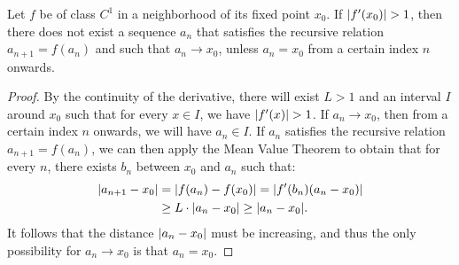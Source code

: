 \begin{theorem}
Let $f$ be of class $C^1$ in a neighborhood of its fixed point $x_0$. If
${\left|f'(x_0)\right|}>1$, then there does not exist a sequence $a_n$ that satisfies the
recursive relation $a_{n+1} = f(a_n)$ and such that $a_n \to x_0$, unless $a_n =
x_0$ from a certain index $n$ onwards.
\end{theorem}
%
\begin{proof}
By the continuity of the derivative, there will exist $L>1$ and an interval $I$
around $x_0$ such that for every $x\in I$, we have ${\left|f'(x)\right|} > 1$. If $a_n
\to x_0$, then from a certain index $n$ onwards, we will have $a_n \in I$. If
$a_n$ satisfies the recursive relation $a_{n+1} = f(a_n)$, we can then apply the
Mean Value Theorem to obtain that for every $n$, there exists $b_n$ between
$x_0$ and $a_n$ such that:
\begin{align*}
  {\left|a_{n+1} - x_0\right|}
  &= {\left|f(a_n) - f(x_0)\right|}
  = {\left|f'(b_n)(a_n - x_0)\right|} \\
  &\ge L \cdot {\left|a_n - x_0\right|} \ge {\left|a_n - x_0\right|}.
\end{align*}
It follows that the distance ${\left|a_n - x_0\right|}$ must be increasing, and thus the
only possibility for $a_n \to x_0$ is that $a_n = x_0$.
\end{proof}